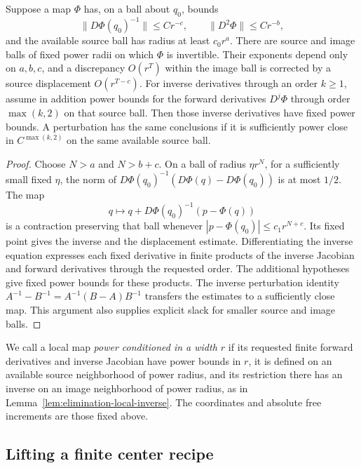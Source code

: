 \begin{lemma}
\label{lem:elimination-local-inverse}
Suppose a map $\Phi$ has, on a ball about $q_0$, bounds
\[
 \|D\Phi(q_0)^{-1}\|\le C r^{-c},\qquad
 \|D^2\Phi\|\le C r^{-b},
\]
and the available source ball has radius at least $c_0r^a$.
There are source and image balls of fixed power radii on which $\Phi$
is invertible.  Their exponents depend only on $a,b,c$, and a
discrepancy $O(r^T)$ within the image ball is corrected by a source
displacement $O(r^{T-c})$.  For inverse derivatives through an order
$k\ge1$, assume in addition power bounds for the forward derivatives
$D^j\Phi$ through order $\max(k,2)$ on that source ball.  Then those
inverse derivatives have fixed power bounds.  A perturbation has the
same conclusions if it is sufficiently power close in
$C^{\max(k,2)}$ on the same available source ball.
\end{lemma}

\begin{proof}
Choose $N>a$ and $N>b+c$.  On a ball of radius $\eta r^N$, for a
sufficiently small fixed $\eta$, the norm of
$D\Phi(q_0)^{-1}(D\Phi(q)-D\Phi(q_0))$ is at most $1/2$.
The map
\[
 q\longmapsto q+D\Phi(q_0)^{-1}(p-\Phi(q))
\]
is a contraction preserving that ball whenever
$|p-\Phi(q_0)|\le c_1r^{N+c}$.  Its fixed point gives the inverse
and the displacement estimate.  Differentiating the inverse equation
expresses each fixed derivative in finite products of the inverse
Jacobian and forward derivatives through the requested order.  The
additional hypotheses give fixed power bounds for these products.
The inverse perturbation identity
$A^{-1}-B^{-1}=A^{-1}(B-A)B^{-1}$ transfers the estimates to a
sufficiently close map.  This argument also supplies explicit slack
for smaller source and image balls.
\end{proof}

We call a local map \emph{power conditioned in a width $r$} if its
requested finite forward derivatives and inverse Jacobian have power
bounds in $r$, it is defined on an available source neighborhood of
power radius, and its restriction there has an inverse on an image
neighborhood of power radius, as in
Lemma~\ref{lem:elimination-local-inverse}.  The coordinates and
absolute free increments are those fixed above.

\subsection{Lifting a finite center recipe}

